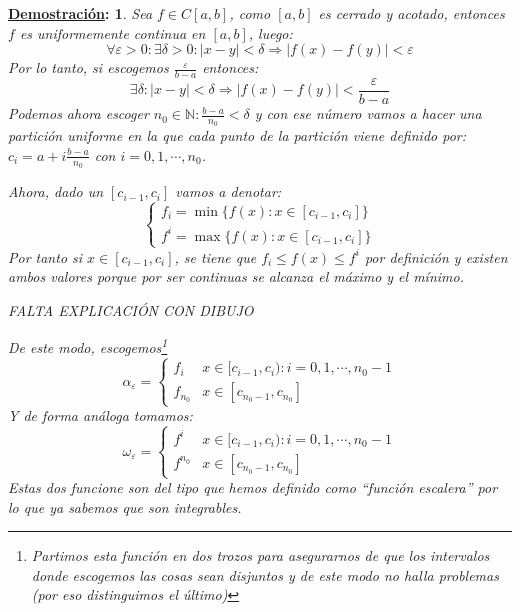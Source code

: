 \documentclass[10pt,a4paper,openright]{book}
\theoremstyle{break}
\newtheorem*{demo}{\underline{Demostración}:}
\begin{document}
\begin{demo}
Sea $f\in C[a,b]$, como $[a,b]$ es cerrado y acotado, entonces $f$ es uniformemente continua en $[a,b]$, luego:
$$\forall \varepsilon > 0: \exists \delta> 0: |x-y|<\delta\Rightarrow |f(x)-f(y)|<\varepsilon$$
Por lo tanto, si escogemos $\frac{\varepsilon}{b-a}$ entonces:
$$\exists \delta : |x-y|<\delta \Rightarrow |f(x)-f(y)|<\frac{\varepsilon}{b-a}$$
Podemos ahora escoger $n_0\in \mathbb N: \frac{b-a}{n_0}<\delta$ y con ese número vamos a hacer una partición uniforme en la que cada punto de la partición viene definido por: $c_i = a+ i \frac{b-a}{n_0}$ con $i = 0, 1, \cdots , n_0$.

Ahora, dado un $[c_{i-1}, c_i]$ vamos a denotar:
$$\begin{cases} f_i = \min\{ f(x): x\in [c_{i-1},c_i]\} \\ f^i = \max\{f(x): x\in [c_{i-1},c_i]\}\end{cases}$$
Por tanto si $x\in [c_{i-1},c_i]$, se tiene que $f_i\leq f(x)\leq f^i$ por definición y existen ambos valores porque por ser continuas se alcanza el máximo y el mínimo.

FALTA EXPLICACIÓN CON DIBUJO

De este modo, escogemos\footnote{Partimos esta función en dos trozos para asegurarnos de que los intervalos donde escogemos las cosas sean disjuntos y de este modo no halla problemas (por eso distinguimos el último)}
$$\alpha_\varepsilon = \begin{cases} f_i & x\in [c_{i-1},c_i): i = 0,1,\cdots , n_0-1 \\ f_{n_0}  & x\in[c_{n_0-1},c_{n_0}] \end{cases}$$
Y de forma análoga tomamos:
$$\omega_\varepsilon = \begin{cases} f^{i} & x\in [c_{i-1},c_i): i = 0,1,\cdots , n_0-1 \\ f^{n_0}  & x\in[c_{n_0-1},c_{n_0}] \end{cases}$$
Estas dos funcione son del tipo que hemos definido como ``función escalera'' por lo que ya sabemos que son integrables.


\end{demo}
\end{document}

